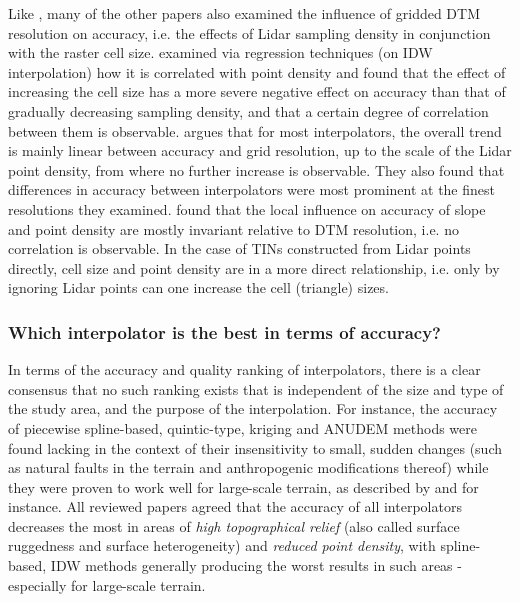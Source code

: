 Like \cite{aguilar_etal_2010}, many of the other papers also examined the influence of gridded DTM resolution on accuracy, i.e. the effects of Lidar sampling density in conjunction with the raster cell size. \cite{chow_hodgson_2009} examined via regression techniques (on IDW interpolation) how it is correlated with point density and found that the effect of increasing the cell size has a more severe negative effect on accuracy than that of gradually decreasing sampling density, and that a certain degree of correlation between them is observable. \cite{guo_etal_2010} argues that for most interpolators, the overall trend is mainly linear between accuracy and grid resolution, up to the scale of the Lidar point density, from where no further increase is observable. They also found that differences in accuracy between interpolators were most prominent at the finest resolutions they examined. \cite{bater_coops_2009} found that the local influence on accuracy of slope and point density are mostly invariant relative to DTM resolution, i.e. no correlation is observable. In the case of TINs constructed from Lidar points directly, cell size and point density are in a more direct relationship, i.e. only by ignoring Lidar points can one increase the cell (triangle) sizes.

\subsubsection{Which interpolator is the best in terms of accuracy?}

In terms of the accuracy and quality ranking of interpolators, there is a clear consensus that no such ranking exists that is independent of the size and type of the study area, and the purpose of the interpolation. For instance, the accuracy of piecewise spline-based, quintic-type, kriging and ANUDEM methods were found lacking in the context of their insensitivity to small, sudden changes (such as natural faults in the terrain and anthropogenic modifications thereof) while they were proven to work well for large-scale terrain, as described by \cite{bater_coops_2009} and \cite{guo_etal_2010} for instance. All reviewed papers agreed that the accuracy of all interpolators decreases the most in areas of \textit{high topographical relief} (also called surface ruggedness and surface heterogeneity) and \textit{reduced point density}, with spline-based, IDW methods generally producing the worst results in such areas - especially for large-scale terrain.

